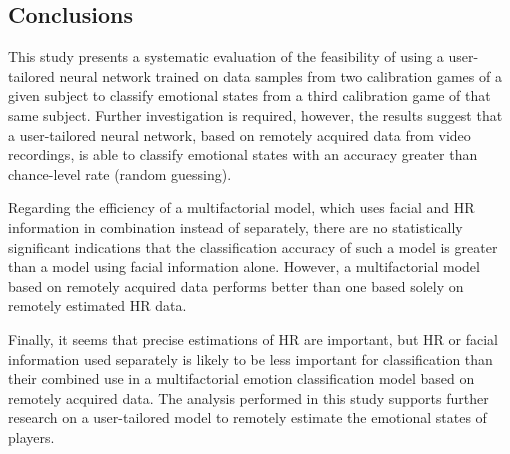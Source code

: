 
\subsection{Conclusions}

This study presents a systematic evaluation of the feasibility of using a user-tailored neural network trained on data samples from two calibration games of a given subject to classify emotional states from a third calibration game of that same subject. Further investigation is required, however, the results suggest that a user-tailored neural network, based on remotely acquired data from video recordings, is able to classify emotional states with an accuracy greater than chance-level rate (random guessing).

Regarding the efficiency of a multifactorial model, which uses facial and HR information in combination instead of separately, there are no statistically significant indications that the classification accuracy of such a model is greater than a model using facial information alone. However, a multifactorial model based on remotely acquired data performs better than one based solely on remotely estimated HR data.

Finally, it seems that precise estimations of HR are important, but HR or facial information used separately is likely to be less important for classification than their combined use in a multifactorial emotion classification model based on remotely acquired data. The analysis performed in this study supports further research on a user-tailored model to remotely estimate the emotional states of players.

